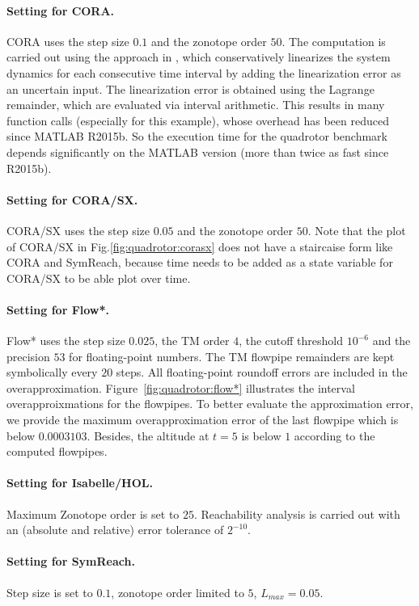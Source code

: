 \documentclass[EPiC]{easychair}
\begin{document}
\paragraph{Setting for CORA.}
CORA uses the step size $0.1$ and the zonotope order $50$. The computation is carried out using the approach in \cite{Althoff2008c}, which conservatively linearizes the system dynamics for each consecutive time interval by adding the linearization error as an uncertain input. The linearization error is obtained using the Lagrange remainder, which are evaluated via interval arithmetic. This results in many function calls (especially for this example), whose overhead has been reduced since MATLAB R2015b. So the execution time for the quadrotor benchmark depends significantly on the MATLAB version (more than twice as fast since R2015b).

\paragraph{Setting for CORA/SX.}
CORA/SX uses the step size $0.05$ and the zonotope order $50$. Note that the plot of CORA/SX in Fig.\;\ref{fig:quadrotor:corasx} does not have a staircaise form like CORA and SymReach, because time needs to be added as a state variable for CORA/SX to be able plot over time.

\paragraph{Setting for Flow*.}
Flow* uses the step size $0.025$, the TM order $4$, the cutoff threshold $10^{-6}$ and the precision $53$ for floating-point numbers. The TM flowpipe remainders are kept symbolically every $20$ steps. All floating-point roundoff errors are included in the overapproximation. Figure~\ref{fig:quadrotor:flow*} illustrates the interval overapproixmations for the flowpipes. To better evaluate the approximation error, we provide the maximum overapproximation error of the last flowpipe which is below $0.0003103$. Besides, the altitude at $t=5$ is below $1$ according to the computed flowpipes.

\paragraph{Setting for Isabelle/HOL.}
Maximum Zonotope order is set to $25$. Reachability analysis is carried out with an (absolute and relative) error tolerance of $2^{-10}$.

\paragraph{Setting for SymReach.}
Step size is set to $0.1$, zonotope order limited to $5$, $L_{max} = 0.05$. 
\end{document}
